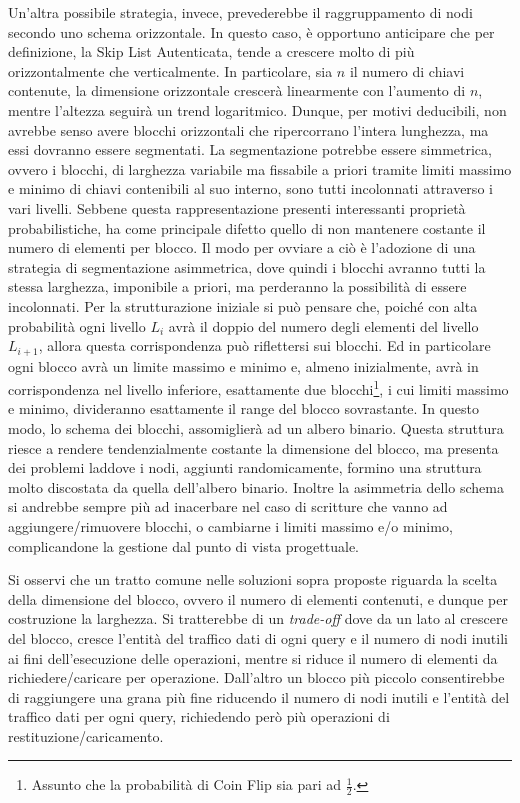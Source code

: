 		Un'altra possibile strategia, invece, prevederebbe il raggruppamento di nodi secondo uno schema orizzontale. In questo caso, è opportuno anticipare che per definizione, la Skip List Autenticata, tende a crescere molto di più orizzontalmente che verticalmente. In particolare, sia $ n $ il numero di chiavi contenute, la dimensione orizzontale crescerà linearmente con l'aumento di $ n $, mentre l'altezza seguirà un trend logaritmico. Dunque, per motivi deducibili, non avrebbe senso avere blocchi orizzontali che ripercorrano l'intera lunghezza, ma essi dovranno essere segmentati. La segmentazione potrebbe essere simmetrica, ovvero i blocchi, di larghezza variabile ma fissabile a priori tramite limiti massimo e minimo di chiavi contenibili al suo interno, sono tutti incolonnati attraverso i vari livelli. Sebbene questa rappresentazione presenti interessanti proprietà probabilistiche, ha come principale difetto quello di non mantenere costante il numero di elementi per blocco. Il modo per ovviare a ciò è l'adozione di una strategia di segmentazione asimmetrica, dove quindi i blocchi avranno tutti la stessa larghezza, imponibile a priori, ma perderanno la possibilità di essere incolonnati. Per la strutturazione iniziale si può pensare che, poiché con alta probabilità ogni livello $ L_{i} $ avrà il doppio del numero degli elementi del livello $ L_{i+1} $, allora questa corrispondenza può riflettersi sui blocchi. Ed in particolare ogni blocco avrà un limite massimo e minimo e, almeno inizialmente, avrà in corrispondenza nel livello inferiore, esattamente due blocchi\footnote{Assunto che la probabilità di Coin Flip sia pari ad $ \frac{1}{2} $.}, i cui limiti massimo e minimo, divideranno esattamente il range del blocco sovrastante. In questo modo, lo schema dei blocchi, assomiglierà ad un albero binario. Questa struttura riesce a rendere tendenzialmente costante la dimensione del blocco, ma presenta dei problemi laddove i nodi, aggiunti randomicamente, formino una struttura molto discostata da quella dell'albero binario. Inoltre la asimmetria dello schema si andrebbe sempre più ad inacerbare nel caso di scritture che vanno ad aggiungere/rimuovere blocchi, o cambiarne i limiti massimo e/o minimo, complicandone la gestione dal punto di vista progettuale.
		
		Si osservi che un tratto comune nelle soluzioni sopra proposte riguarda la scelta della dimensione del blocco, ovvero il numero di elementi contenuti, e dunque per costruzione la larghezza. Si tratterebbe di un \textit{trade-off} dove da un lato al crescere del blocco, cresce l'entità del traffico dati di ogni query e il numero di nodi inutili ai fini dell'esecuzione delle operazioni, mentre si riduce il numero di elementi da richiedere/caricare per operazione. Dall'altro un blocco più piccolo consentirebbe di raggiungere una grana più fine riducendo il numero di nodi inutili e l'entità del traffico dati per ogni query, richiedendo però più operazioni di restituzione/caricamento.
		
